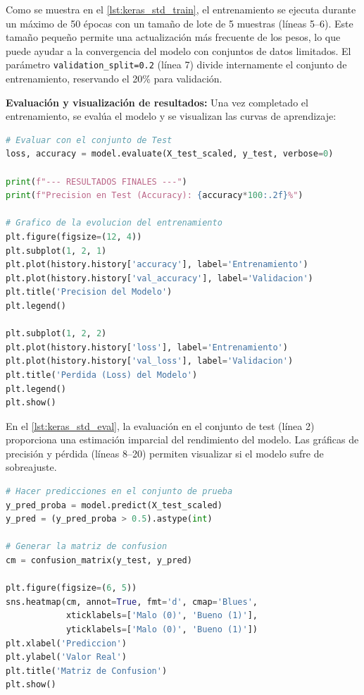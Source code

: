 Como se muestra en el \autoref{lst:keras_std_train}, el entrenamiento se ejecuta durante un máximo de 50 épocas con un tamaño de lote de 5 muestras (líneas 5--6). Este tamaño pequeño permite una actualización más frecuente de los pesos, lo que puede ayudar a la convergencia del modelo con conjuntos de datos limitados. El parámetro \texttt{validation\_split=0.2} (línea 7) divide internamente el conjunto de entrenamiento, reservando el 20\% para validación.

\textbf{Evaluación y visualización de resultados:} Una vez completado el entrenamiento, se evalúa el modelo y se visualizan las curvas de aprendizaje:

\begin{lstlisting}[language=Python, caption={Evaluación del modelo y visualización de curvas de aprendizaje.}, label={lst:keras_std_eval}]
# Evaluar con el conjunto de Test
loss, accuracy = model.evaluate(X_test_scaled, y_test, verbose=0)

print(f"--- RESULTADOS FINALES ---")
print(f"Precision en Test (Accuracy): {accuracy*100:.2f}%")

# Grafico de la evolucion del entrenamiento
plt.figure(figsize=(12, 4))
plt.subplot(1, 2, 1)
plt.plot(history.history['accuracy'], label='Entrenamiento')
plt.plot(history.history['val_accuracy'], label='Validacion')
plt.title('Precision del Modelo')
plt.legend()

plt.subplot(1, 2, 2)
plt.plot(history.history['loss'], label='Entrenamiento')
plt.plot(history.history['val_loss'], label='Validacion')
plt.title('Perdida (Loss) del Modelo')
plt.legend()
plt.show()
\end{lstlisting}

En el \autoref{lst:keras_std_eval}, la evaluación en el conjunto de test (línea 2) proporciona una estimación imparcial del rendimiento del modelo. Las gráficas de precisión y pérdida (líneas 8--20) permiten visualizar si el modelo sufre de sobreajuste.

\begin{lstlisting}[language=Python, caption={Generación de la matriz de confusión.}, label={lst:keras_std_confusion}]
# Hacer predicciones en el conjunto de prueba
y_pred_proba = model.predict(X_test_scaled)
y_pred = (y_pred_proba > 0.5).astype(int)

# Generar la matriz de confusion
cm = confusion_matrix(y_test, y_pred)

plt.figure(figsize=(6, 5))
sns.heatmap(cm, annot=True, fmt='d', cmap='Blues',
            xticklabels=['Malo (0)', 'Bueno (1)'],
            yticklabels=['Malo (0)', 'Bueno (1)'])
plt.xlabel('Prediccion')
plt.ylabel('Valor Real')
plt.title('Matriz de Confusion')
plt.show()
\end{lstlisting}

